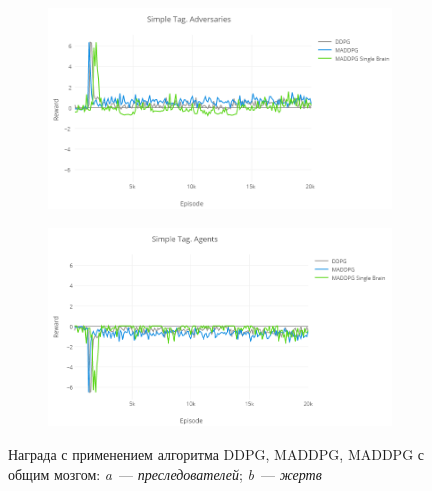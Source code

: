 \begin{figure}[!htbp]
    \begin{subfigure}[t]{\dimexpr.5\linewidth-1.3em\relax} %
        \includegraphics[height=0.19\textheight,valign=t]{my_folder/images/ch5/st-reward-ad.png} %
    \end{subfigure}
    \begin{subfigure}[t]{\dimexpr.5\linewidth-1.3em\relax}%
        \includegraphics[height=0.19\textheight,valign=t]{my_folder/images/ch5/st-reward-ag.png}%
    \end{subfigure}
    \captionsetup{justification=centering} %
    \caption{Награда с применением алгоритма DDPG, MADDPG, MADDPG с общим мозгом: {\itshape a}~--- \textit{преследователей}; {\itshape b}~--- \textit{жертв}}\label{fig:spbpu_main_bld-two-photos}
\end{figure}

